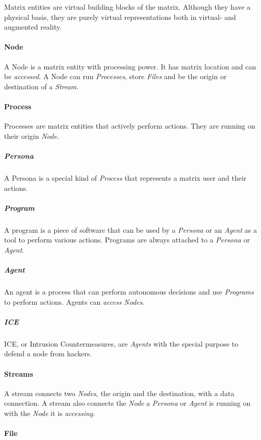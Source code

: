 Matrix entities are virtual building blocks of the matrix. Although they have a physical basis,
they are purely virtual representations both in virtual- and augmented reality.

\paragraph{Node}
\label{par:node}

A Node is a matrix entity with processing power. It has matrix location and can be
\emph{accessed}. A Node can run \emph{Processes}, store \emph{Files} and be the origin or
destination of a \emph{Stream}.

\paragraph{Process}
\label{par:process}

Processes are matrix entities that actively perform actions. They are running on their origin
\emph{Node}.

\subparagraph{Persona}
A Persona is a special kind of \emph{Process} that represents a matrix user and their actions.

\subparagraph{Program}
A program is a piece of software that can be used by a \emph{Persona} or an \emph{Agent} as a tool
to perform various actions. Programs are always attached to a \emph{Persona} or \emph{Agent}.

\subparagraph{Agent}
An agent is a process that can perform autonomous decisions and use \emph{Programs} to perform
actions. Agents can \emph{access} \emph{Nodes}.

\subparagraph{ICE}
ICE, or Intrusion Countermeasures, are \emph{Agents} with the special purpose to defend a node
from hackers.

\paragraph{Streams}
\label{par:stream}

A stream connects two \emph{Nodes}, the origin and the destination, with a data connection.
A stream also connects the \emph{Node} a \emph{Persona} or \emph{Agent} is running on with
the \emph{Node} it is \emph{accessing}.

\paragraph{File}
\label{par:file}

